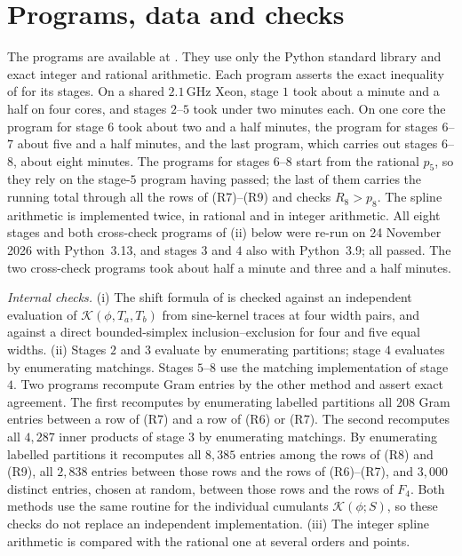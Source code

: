 \documentclass[11pt,colorlinks]{charlie}
\newcommand{\Ka}{\mathcal{K}}
\begin{document}
\section{Programs, data and checks}\label{app:replay}
The programs are available at \coderepo. They use only the Python standard library and exact integer and rational arithmetic. Each program asserts the exact inequality of  for its stages. On a shared $2.1$\,GHz Xeon, stage $1$ took about a minute and a half on four cores, and stages $2$--$5$ took under two minutes each. On one core the program for stage $6$ took about two and a half minutes, the program for stages $6$--$7$ about five and a half minutes, and the last program, which carries out stages $6$--$8$, about eight minutes. The programs for stages $6$--$8$ start from the rational $p_5$, so they rely on the stage-$5$ program having passed; the last of them carries the running total through all the rows of (R7)--(R9) and checks $R_8>p_8$. The spline arithmetic is implemented twice, in rational and in integer arithmetic. All eight stages and both cross-check programs of (ii) below were re-run on 24 November 2026 with Python~3.13, and stages $3$ and $4$ also with Python~3.9; all passed. The two cross-check programs took about half a minute and three and a half minutes.

\emph{Internal checks.} (i) The shift formula of  is checked against an independent evaluation of $\Ka(\phi,T_a,T_b)$ from sine-kernel traces at four width pairs, and against a direct bounded-simplex inclusion--exclusion for four and five equal widths. (ii) Stages $2$ and $3$ evaluate  by enumerating partitions; stage $4$ evaluates  by enumerating matchings. Stages $5$--$8$ use the matching implementation of stage $4$. Two programs recompute Gram entries by the other method and assert exact agreement. The first recomputes by enumerating labelled partitions all $208$ Gram entries between a row of (R7) and a row of (R6) or (R7). The second recomputes all $4{,}287$ inner products of stage $3$ by enumerating matchings. By enumerating labelled partitions it recomputes all $8{,}385$ entries among the rows of (R8) and (R9), all $2{,}838$ entries between those rows and the rows of (R6)--(R7), and $3{,}000$ distinct entries, chosen at random, between those rows and the rows of $F_4$. Both methods use the same routine for the individual cumulants $\Ka(\phi;S)$, so these checks do not replace an independent implementation. (iii) The integer spline arithmetic is compared with the rational one at several orders and points.
\end{document}
